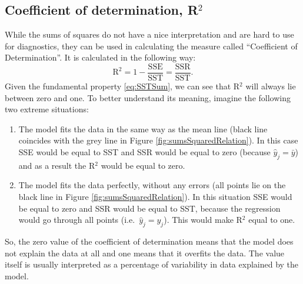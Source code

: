 \documentclass[
]{book}
\providecommand{\tightlist}{%
  \setlength{\itemsep}{0pt}\setlength{\parskip}{0pt}}
\theoremstyle{definition}
\theoremstyle{definition}
\theoremstyle{definition}
\theoremstyle{definition}
\theoremstyle{remark}
\begin{document}
\subsection{\texorpdfstring{Coefficient of determination, R\(^2\)}{Coefficient of determination, R\^{}2}}\label{coefficient-of-determination-r2}

While the sums of squares do not have a nice interpretation and are hard to use for diagnostics, they can be used in calculating the measure called ``Coefficient of Determination''. It is calculated in the following way:
\begin{equation}
    \mathrm{R}^2 = 1 - \frac{\mathrm{SSE}}{\mathrm{SST}} = \frac{\mathrm{SSR}}{\mathrm{SST}} .
    \label{eq:Determination}
\end{equation}
Given the fundamental property \eqref{eq:SSTSum}, we can see that R\(^2\) will always lie between zero and one. To better understand its meaning, imagine the following two extreme situations:

\begin{enumerate}
\def\labelenumi{\arabic{enumi}.}
\tightlist
\item
  The model fits the data in the same way as the mean line (black line coincides with the grey line in Figure \ref{fig:sumsSquaredRelation}). In this case SSE would be equal to SST and SSR would be equal to zero (because \(\hat{y}_j=\bar{y}\)) and as a result the R\(^2\) would be equal to zero.
\item
  The model fits the data perfectly, without any errors (all points lie on the black line in Figure \ref{fig:sumsSquaredRelation}). In this situation SSE would be equal to zero and SSR would be equal to SST, because the regression would go through all points (i.e.~\(\hat{y}_j=y_j\)). This would make R\(^2\) equal to one.
\end{enumerate}

So, the zero value of the coefficient of determination means that the model does not explain the data at all and one means that it overfits the data. The value itself is usually interpreted as a percentage of variability in data explained by the model.
\end{document}
